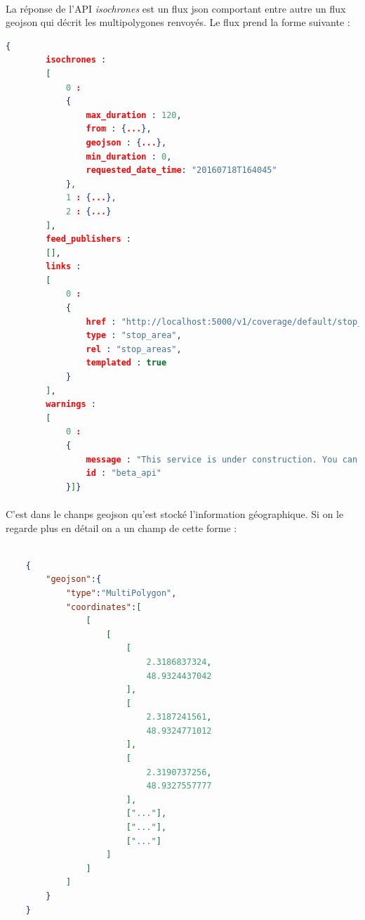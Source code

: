 \documentclass[a4paper]{report}
\begin{document}
\paragraph{} La réponse de l'API \emph{isochrones} est un flux json comportant entre autre un flux geojson qui décrit les multipolygones renvoyés. Le flux prend la forme suivante :


\begin{lstlisting}[language=json,firstnumber=1]
    {
        isochrones :
        [
            0 :
            {
                max_duration : 120,
                from : {...},
                geojson : {...},
                min_duration : 0,
                requested_date_time: "20160718T164045"
            },
            1 : {...},
            2 : {...}
        ],
        feed_publishers :
        [],
        links :
        [
            0 :
            {
                href : "http://localhost:5000/v1/coverage/default/stop_areas/{stop_area.id}",
                type : "stop_area",
                rel : "stop_areas",
                templated : true
            }
        ],
        warnings :
        [
            0 :
            {
                message : "This service is under construction. You can help through github.com/CanalTP/navitia",
                id : "beta_api"
            }]}

\end{lstlisting}

\paragraph{} C'est dans le chanps geojson qu'est stocké l'information géographique. Si on le regarde plus en détail on a un champ de cette forme :


\begin{lstlisting}[language=json,firstnumber=1]

    {
        "geojson":{
            "type":"MultiPolygon",
            "coordinates":[
                [
                    [
                        [
                            2.3186837324,
                            48.9324437042
                        ],
                        [
                            2.3187241561,
                            48.9324771012
                        ],
                        [
                            2.3190737256,
                            48.9327557777
                        ],
                        ["..."],
                        ["..."],
                        ["..."]
                    ]
                ]
            ]
        }
    }
\end{lstlisting}
\end{document}
